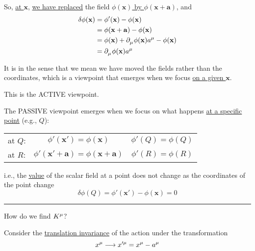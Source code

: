 \documentclass{article}
\begin{document}
So, \underline{at $\mathbf{x}$}, \underline{we have replaced} the field \underline{$\phi (\mathbf{x})$ by $\phi ( \mathbf{x} + \mathbf{a} )$}, and
\begin{align*}
    \delta \phi (\mathbf{x}) &= \phi' (\mathbf{x}) - \phi (\mathbf{x}) \\
    &= \phi ( \mathbf{x} + \mathbf{a} ) - \phi (\mathbf{x}) \\
    &= \phi (\mathbf{x}) + \tensor{\partial}{_\mu} \phi (\mathbf{x}) \tensor{a}{^\mu} - \phi (\mathbf{x}) \\
    &= \tensor{\partial}{_\mu} \phi (\mathbf{x}) \tensor{a}{^\mu}
\end{align*}

\noindent It is in the sense that we mean we have moved the fields rather than the coordinates, which is a viewpoint that emerges when we focus \underline{on a given $\mathbf{x}$}.

\noindent This is the ACTIVE viewpoint.

\noindent The PASSIVE viewpoint emerges when we focus on what happens \underline{at a specific} \underline{point} (e.g., $Q$):

\vspace*{-16pt} \begin{center}
\begin{tabular}{lcc}
    at $Q$: & $\phi' (\mathbf{x}') = \phi (\mathbf{x})$ & $\phi' (Q) = \phi(Q)$ \\
    at $R$: & $\phi' ( \mathbf{x}' + \mathbf{a} ) = \phi ( \mathbf{x} + \mathbf{a} )$ & $\phi' (R) = \phi (R)$
\end{tabular}
\end{center} \vspace*{-16pt}

\noindent i.e., the \underline{\underline{value}} of the scalar field at a point does not change as the coordinates of the point change
\begin{equation*}
    \delta \phi (Q) = \phi' (\mathbf{x}') - \phi (\mathbf{x}) = 0
\end{equation*}

\noindent\rule{\textwidth}{.5pt}


\noindent How do we find $\tensor{K}{^\mu}$?

\noindent Consider the \underline{translation invariance} of the action under the transformation
\begin{equation*} %
    \tensor{x}{^\mu} \longrightarrow \tensor{x}{^\prime^\mu} = \tensor{x}{^\mu} - \tensor{a}{^\mu}
\end{equation*}
\end{document}

